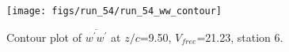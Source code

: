 \begin{figure}[H]
\centering
\texttt{[image: figs/run\_54/run\_54\_ww\_contour]}
\caption{Contour plot of $\overline{w^\prime w^\prime}$ at $z/c$=9.50, $V_{free}$=21.23, station 6.}
\label{fig:run_54_ww_contour}
\end{figure}


